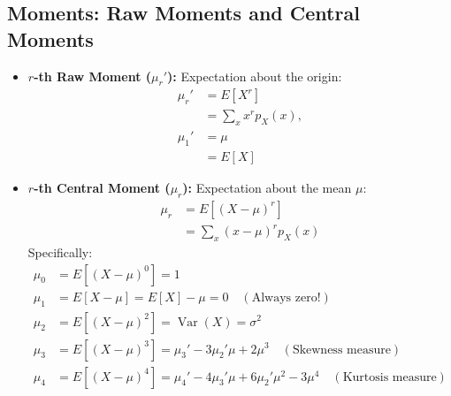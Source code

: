 \documentclass[12pt,a4paper]{article}
\begin{document}
\subsection{Moments: Raw Moments and Central Moments}
\begin{itemize}[leftmargin=*, itemsep=3pt]
  \item \textbf{$r$-th Raw Moment ($\mu_r'$):} Expectation about the origin:
  \begin{equation}
    \begin{aligned}
      \mu_r' &= E[X^r] \\[3pt]
      &= \sum_{x} x^r p_X(x), \\
      \mu_1' &= \mu \\[3pt]
      &= E[X]
    \end{aligned}
  \end{equation}
  \item \textbf{$r$-th Central Moment ($\mu_r$):} Expectation about the mean $\mu$:
  \begin{equation}
    \begin{aligned}
      \mu_r &= E[(X - \mu)^r] \\[3pt]
      &= \sum_{x} (x - \mu)^r p_X(x)
    \end{aligned}
  \end{equation}
  Specifically:
  \begin{align}
    \mu_0 &= E[(X-\mu)^0] = 1 \\[2pt]
    \mu_1 &= E[X - \mu] = E[X] - \mu = 0 \quad (\text{Always zero!}) \\[2pt]
    \mu_2 &= E[(X - \mu)^2] = \operatorname{Var}(X) = \sigma^2 \\[2pt]
    \mu_3 &= E[(X - \mu)^3] = \mu_3' - 3\mu_2'\mu + 2\mu^3 \quad (\text{Skewness measure}) \\[2pt]
    \mu_4 &= E[(X - \mu)^4] = \mu_4' - 4\mu_3'\mu + 6\mu_2'\mu^2 - 3\mu^4 \quad (\text{Kurtosis measure})
  \end{align}
\end{itemize}
\end{document}

